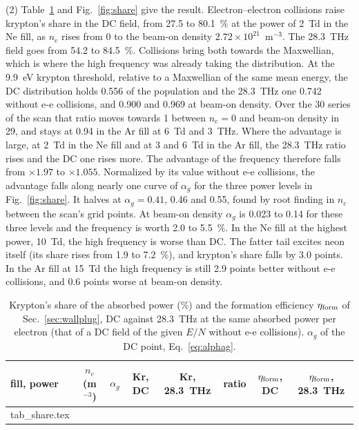 \documentclass[11pt]{article}
\makeatletter
\numberwithin{equation}{section}
\newcommand{\tabinput}[1]{\@@input #1 }
\makeatother
\begin{document}
{\noindent}(2) Table~\ref{tab:share} and Fig.~\ref{fig:share} give the result.
Electron--electron collisions raise krypton's share in the DC field, from 27.5 to
80.1~\% at the power of 2~Td in the Ne fill, as $n_e$ rises from 0 to the beam-on
density $2.72\times10^{21}$~m$^{-3}$. The 28.3~THz field goes from 54.2 to
84.5~\%. Collisions bring both towards the Maxwellian, which is where the high
frequency was already taking the distribution. At the 9.9~eV krypton threshold,
relative to a Maxwellian of the same mean energy, the DC distribution holds 0.556
of the population and the 28.3~THz one 0.742 without e-e collisions, and 0.900 and
0.969 at beam-on density. Over the 30 series of the scan that
ratio moves towards 1 between $n_e=0$ and beam-on density in 29, and stays at 0.94 in
the Ar fill at 6~Td and 3~THz. Where the advantage is large, at 2~Td in the Ne fill
and at 3 and 6~Td in the Ar fill, the 28.3~THz ratio rises and the DC one rises more.
The advantage of the frequency therefore falls from
$\times1.97$ to $\times1.055$. Normalized by its value without e-e collisions,
the advantage falls along nearly one curve of $\alpha_g$ for the three power levels
in Fig.~\ref{fig:share}. It halves at $\alpha_g=0.41$, 0.46 and 0.55, found by root
finding in $n_e$ between the scan's grid points. At beam-on
density $\alpha_g$ is 0.023 to 0.14 for these three levels and the frequency is
worth 2.0 to 5.5~\%. In the Ne fill at the highest power, 10~Td, the high frequency
is worse than DC. The fatter tail excites neon itself (its share rises from 1.9 to
7.2~\%), and krypton's share falls by 3.0 points. In the Ar fill at 15~Td the high
frequency is still 2.9 points better without e-e collisions, and 0.6 points worse at
beam-on density.

\begin{table}[h]
\centering
\caption{Krypton's share of the absorbed power (\%) and the formation efficiency
$\eta_{\rm form}$ of Sec.~\ref{sec:wallplug}, DC against 28.3~THz at the same absorbed
power per electron (that of a DC field of the given $E/N$ without e-e
collisions). $\alpha_g$ of the DC point, Eq.~\eqref{eq:alphag}.}
\label{tab:share}
\setlength{\tabcolsep}{5pt}
\begin{tabular}{lccccccc}
\toprule
fill, power & $n_e$ (m$^{-3}$) & $\alpha_g$ & Kr, DC & Kr, 28.3~THz & ratio & $\eta_{\rm form}$, DC & $\eta_{\rm form}$, 28.3~THz\\
\midrule
\tabinput{tab_share.tex}
\bottomrule
\end{tabular}
\end{table}
\end{document}
